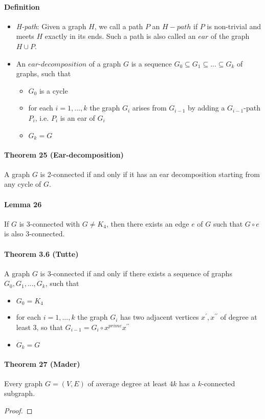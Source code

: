 \paragraph{Definition}
\begin{itemize}
    \item \textit{H-path}: Given a graph $ H $, we call a path $ P $ an $H-path$ 
    if $ P $ is non-trivial and meets $ H $ exactly in its ends. Such a path is also 
    called an $ ear $ of the graph $ H \cup P$.
    \item An $ear$-$decomposition$ of a graph $ G $ is a sequence $ G_0 \subseteq 
    G_1 \subseteq ... \subseteq G_k $ of graphs, such that 
        \begin{itemize}
            \item $G_0$ is a cycle
            \item for each $ i = 1,...,k$ the graph $ G_i $ arises from $ G_{i-1}$
            by adding a $ G_{i-1}$-path $P_i$, i.e. $P_i$ is an ear of $G_i$
            \item $G_k = G$
        \end{itemize} 
\end{itemize}

\paragraph{Theorem 25 (Ear-decomposition)} A graph $ G $ is 2-connected if and only 
if it has an ear decomposition starting from any cycle of $ G$.

\paragraph{Lemma 26} If $ G $ is 3-connected with $ G \neq K_4 $, then there exists 
an edge $ e $ of $ G $ such that $ G \circ e $ is also 3-connected.

\paragraph{Theorem 3.6 (Tutte)} A graph $ G $ is 3-connected if and only if there 
exists a sequence of graphs $ G_0,G_1,...,G_k$, such that 
\begin{itemize}
    \item $G_0 = K_4$
    \item for each $ i = 1,...,k$ the graph $ G_i $ has two adjacent vertices $ x^\prime, 
    x^{\prime\prime} $ of degree at least 3, so that $ G_{i-1} = G_i \circ 
    x^{prime}x^{\prime\prime} $
    \item $ G_k = G$
\end{itemize}

\paragraph{Theorem 27 (Mader)} Every graph $ G = (V,E) $ of average degree at least $ 4k $
has a $k$-connected subgraph.
\begin{proof}
    
\end{proof}